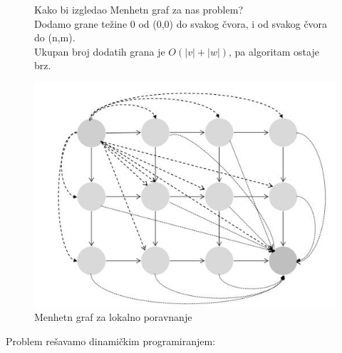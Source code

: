\begin{figure}[H]
     \begin{minipage}{0.59\textwidth}
        Kako bi izgledao Menhetn graf za nas problem? \\
        Dodamo grane težine 0 od (0,0) do svakog čvora, i od svakog čvora do (n,m). \\
        Ukupan broj dodatih grana je $O(|v|+|w|)$, pa algoritam ostaje brz. \\
     \end{minipage}
     \hfill
     \begin{minipage}{0.39\textwidth}
       \includegraphics[width=\linewidth]{poglavlja/5/slike/free_taxi_graf.JPG}
       \caption{Menhetn graf za lokalno poravnanje}\label{}
    \end{minipage}
\end{figure}

Problem rešavamo dinamičkim programiranjem: \\

